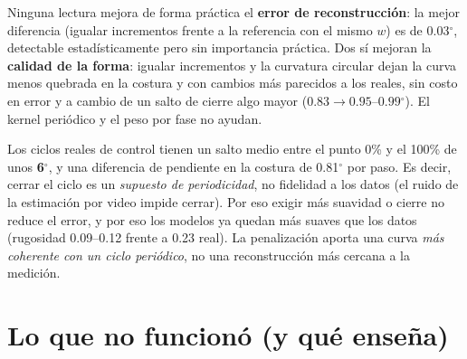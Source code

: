 \documentclass[11pt,a4paper]{article}
\newcommand{\gr}{$^\circ$}
\begin{document}
\begin{resultado}
Ninguna lectura mejora de forma práctica el \textbf{error de reconstrucción}: la mejor diferencia (igualar incrementos frente a la referencia con el mismo $w$) es de 0.03\gr, detectable estadísticamente pero sin importancia práctica. Dos sí mejoran la \textbf{calidad de la forma}: igualar incrementos y la curvatura circular dejan la curva menos quebrada en la costura y con cambios más parecidos a los reales, sin costo en error y a cambio de un salto de cierre algo mayor ($0.83\to0.95$--$0.99$\gr). El kernel periódico y el peso por fase no ayudan.
\end{resultado}

\begin{cuidado}
Los ciclos reales de control tienen un salto medio entre el punto 0\% y el 100\% de unos \textbf{6\gr}, y una diferencia de pendiente en la costura de 0.81\gr{} por paso. Es decir, cerrar el ciclo es un \emph{supuesto de periodicidad}, no fidelidad a los datos (el ruido de la estimación por video impide cerrar). Por eso exigir más suavidad o cierre no reduce el error, y por eso los modelos ya quedan más suaves que los datos (rugosidad 0.09--0.12 frente a 0.23 real). La penalización aporta una curva \emph{más coherente con un ciclo periódico}, no una reconstrucción más cercana a la medición.
\end{cuidado}

\section{Lo que no funcionó (y qué enseña)}
\label{sec:nofunciono}
\end{document}
